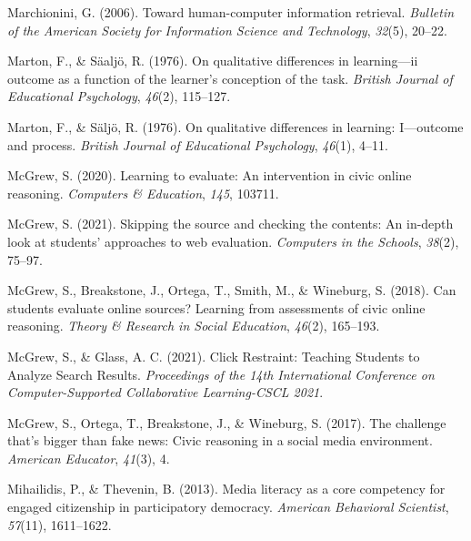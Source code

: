 \documentclass[letterpaper, nobind]{templates/ociamthesis}
\newlength{\cslhangindent}
\newenvironment{CSLReferences}[2] %
 {%
  \setlength{\parindent}{0pt}
  \ifodd #1
  \let\oldpar\par
  \def\par{\hangindent=\cslhangindent\oldpar}
  \fi
  \setlength{\parskip}{1mm}
  \setlength{\baselineskip}{6mm}
 }%
 {}
\begin{document}
\begin{CSLReferences}{1}{0}
\leavevmode{}%
Marchionini, G. (2006). Toward human-computer information retrieval. \emph{Bulletin of the American Society for Information Science and Technology}, \emph{32}(5), 20--22.

\leavevmode{}%
Marton, F., \& Säaljö, R. (1976). On qualitative differences in learning---ii outcome as a function of the learner's conception of the task. \emph{British Journal of Educational Psychology}, \emph{46}(2), 115--127.

\leavevmode{}%
Marton, F., \& Säljö, R. (1976). On qualitative differences in learning: I---outcome and process. \emph{British Journal of Educational Psychology}, \emph{46}(1), 4--11.

\leavevmode{}%
McGrew, S. (2020). Learning to evaluate: An intervention in civic online reasoning. \emph{Computers \& Education}, \emph{145}, 103711.

\leavevmode{}%
McGrew, S. (2021). Skipping the source and checking the contents: An in-depth look at students' approaches to web evaluation. \emph{Computers in the Schools}, \emph{38}(2), 75--97.

\leavevmode{}%
McGrew, S., Breakstone, J., Ortega, T., Smith, M., \& Wineburg, S. (2018). Can students evaluate online sources? Learning from assessments of civic online reasoning. \emph{Theory \& Research in Social Education}, \emph{46}(2), 165--193.

\leavevmode{}%
McGrew, S., \& Glass, A. C. (2021). Click {Restraint}: Teaching {Students} to {Analyze Search Results}. \emph{Proceedings of the 14th {International Conference} on {Computer}-{Supported Collaborative Learning}-{CSCL} 2021}.

\leavevmode{}%
McGrew, S., Ortega, T., Breakstone, J., \& Wineburg, S. (2017). The challenge that's bigger than fake news: Civic reasoning in a social media environment. \emph{American Educator}, \emph{41}(3), 4.

\leavevmode{}%
Mihailidis, P., \& Thevenin, B. (2013). Media literacy as a core competency for engaged citizenship in participatory democracy. \emph{American Behavioral Scientist}, \emph{57}(11), 1611--1622.


\end{CSLReferences}
\end{document}
